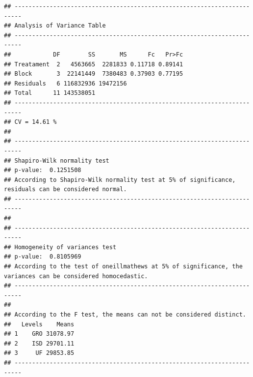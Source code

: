 \documentclass[
]{article}
\begin{document}
\begin{verbatim}
## ------------------------------------------------------------------------
## Analysis of Variance Table
## ------------------------------------------------------------------------
##            DF        SS       MS      Fc   Pr>Fc
## Treatament  2   4563665  2281833 0.11718 0.89141
## Block       3  22141449  7380483 0.37903 0.77195
## Residuals   6 116832936 19472156                
## Total      11 143538051                         
## ------------------------------------------------------------------------
## CV = 14.61 %
## 
## ------------------------------------------------------------------------
## Shapiro-Wilk normality test
## p-value:  0.1251508 
## According to Shapiro-Wilk normality test at 5% of significance, residuals can be considered normal.
## ------------------------------------------------------------------------
## 
## ------------------------------------------------------------------------
## Homogeneity of variances test
## p-value:  0.8105969 
## According to the test of oneillmathews at 5% of significance, the variances can be considered homocedastic.
## ------------------------------------------------------------------------
## 
## According to the F test, the means can not be considered distinct.
##   Levels    Means
## 1    GRO 31078.97
## 2    ISD 29701.11
## 3     UF 29853.85
## ------------------------------------------------------------------------
\end{verbatim}
\end{document}
